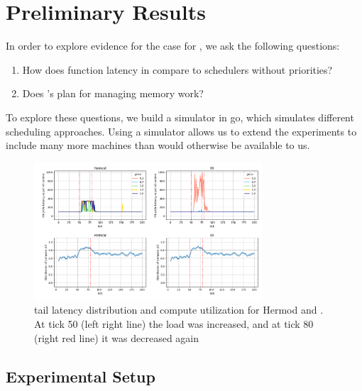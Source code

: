 \section{Preliminary Results}



In order to explore evidence for the case for \sys{}, we ask the following
questions: 
\begin{enumerate}
    \item How does function latency in \sys{} compare to schedulers without
    priorities?
    \item Does \sys{}'s plan for managing memory work?
\end{enumerate}


To explore these questions, we build a simulator in go\cite{golang}, which
simulates different scheduling approaches. Using a simulator allows us to extend
the experiments to include many more machines than would otherwise be available
to us.

\begin{figure}[t!]
    \centering
      \includegraphics[width=8.5cm]{img/hermod_xx_latencies.png}
      \caption{ tail latency distribution and compute utilization for Hermod and
      \sys{}. At tick 50 (left right line) the load was increased, and at tick
      80 (right red line) it was decreased again }
    \label{fig:hermod-xx-edf}
\end{figure}


\subsection{Experimental Setup}

